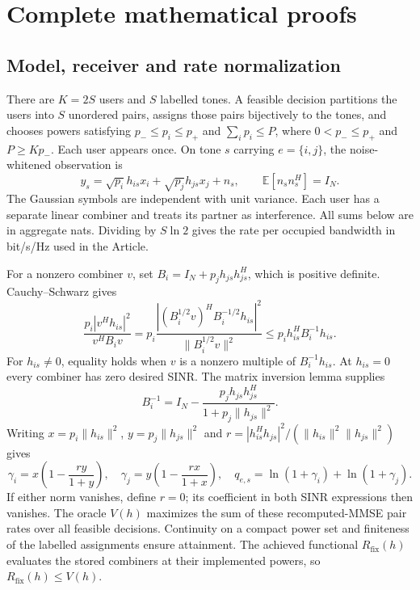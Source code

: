 \documentclass[10pt,letterpaper]{article}
\begin{document}
\FloatBarrier
\section{Complete mathematical proofs}
\label{supp:proofs}

\subsection{Model, receiver and rate normalization}
There are $K=2S$ users and $S$ labelled tones. A feasible decision partitions the users into $S$ unordered pairs, assigns those pairs bijectively to the tones, and chooses powers satisfying $p_-\le p_i\le p_+$ and $\sum_i p_i\le P$, where $0<p_-\le p_+$ and $P\ge Kp_-$. Each user appears once. On tone $s$ carrying $e=\{i,j\}$, the noise-whitened observation is
\begin{equation}
 y_s=\sqrt{p_i}h_{is}x_i+\sqrt{p_j}h_{js}x_j+n_s,
 \qquad \mathbb E[n_sn_s^H]=I_N.
 \label{supp:observation}
\end{equation}
The Gaussian symbols are independent with unit variance. Each user has a separate linear combiner and treats its partner as interference. All sums below are in aggregate nats. Dividing by $S\ln2$ gives the rate per occupied bandwidth in bit/s/Hz used in the Article.

For a nonzero combiner $v$, set $B_i=I_N+p_jh_{js}h_{js}^H$, which is positive definite. Cauchy--Schwarz gives
\begin{equation}
 \frac{p_i|v^Hh_{is}|^2}{v^HB_iv}
 =p_i\frac{|(B_i^{1/2}v)^H B_i^{-1/2}h_{is}|^2}
                 {\|B_i^{1/2}v\|^2}
 \le p_i h_{is}^HB_i^{-1}h_{is}.
 \label{supp:mmse-cs}
\end{equation}
For $h_{is}\ne0$, equality holds when $v$ is a nonzero multiple of $B_i^{-1}h_{is}$. At $h_{is}=0$ every combiner has zero desired SINR. The matrix inversion lemma supplies
\begin{equation}
 B_i^{-1}=I_N-\frac{p_jh_{js}h_{js}^H}{1+p_j\|h_{js}\|^2}.
 \label{supp:mmse-inverse}
\end{equation}
Writing $x=p_i\|h_{is}\|^2$, $y=p_j\|h_{js}\|^2$ and
$r=|h_{is}^Hh_{js}|^2/(\|h_{is}\|^2\|h_{js}\|^2)$ gives
\begin{equation}
 \gamma_i=x\left(1-\frac{ry}{1+y}\right),\quad
 \gamma_j=y\left(1-\frac{rx}{1+x}\right),\quad
 q_{e,s}=\ln(1+\gamma_i)+\ln(1+\gamma_j).
 \label{supp:mmse-rate}
\end{equation}
If either norm vanishes, define $r=0$; its coefficient in both SINR expressions then vanishes. The oracle $V(h)$ maximizes the sum of these recomputed-MMSE pair rates over all feasible decisions. Continuity on a compact power set and finiteness of the labelled assignments ensure attainment. The achieved functional $R_{\mathrm{fix}}(h)$ evaluates the stored combiners at their implemented powers, so $R_{\mathrm{fix}}(h)\le V(h)$.
\end{document}
